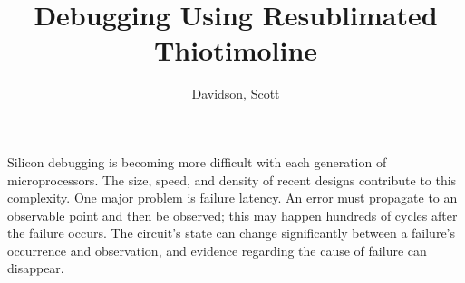 \documentclass[a4paper, 12pt, onepage]{article}
\begin{document}
\author{Davidson, Scott}
\title{Debugging Using Resublimated Thiotimoline}
\maketitle

Silicon debugging is becoming more difficult with each generation of microprocessors.
The size, speed, and density of recent designs contribute to this complexity.
One major problem is failure latency. An error must propagate to an observable
point and then be observed; this may happen hundreds of cycles after the failure
occurs. The circuit's state can change significantly between a failure's occurrence
and observation, and evidence regarding the cause of failure can disappear.
\end{document}

